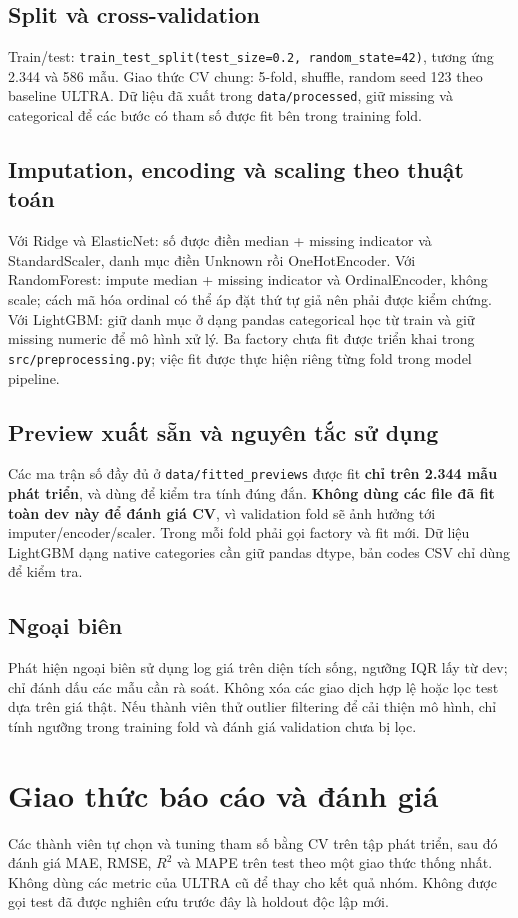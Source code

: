 \documentclass[12pt,a4paper]{article}
\begin{document}
\subsection{Split và cross-validation}
Train/test: \texttt{train\_test\_split(test\_size=0.2, random\_state=42)}, tương ứng 2.344 và 586 mẫu. Giao thức CV chung: 5-fold, shuffle, random seed 123 theo baseline ULTRA. Dữ liệu đã xuất trong \texttt{data/processed}, giữ missing và categorical để các bước có tham số được fit bên trong training fold.
\subsection{Imputation, encoding và scaling theo thuật toán}
Với Ridge và ElasticNet: số được điền median + missing indicator và StandardScaler, danh mục điền Unknown rồi OneHotEncoder. Với RandomForest: impute median + missing indicator và OrdinalEncoder, không scale; cách mã hóa ordinal có thể áp đặt thứ tự giả nên phải được kiểm chứng. Với LightGBM: giữ danh mục ở dạng pandas categorical học từ train và giữ missing numeric để mô hình xử lý. Ba factory chưa fit được triển khai trong \texttt{src/preprocessing.py}; việc fit được thực hiện riêng từng fold trong model pipeline.
\subsection{Preview xuất sẵn và nguyên tắc sử dụng}
Các ma trận số đầy đủ ở \texttt{data/fitted\_previews} được fit \textbf{chỉ trên 2.344 mẫu phát triển}, và dùng để kiểm tra tính đúng đắn. \textbf{Không dùng các file đã fit toàn dev này để đánh giá CV}, vì validation fold sẽ ảnh hưởng tới imputer/encoder/scaler. Trong mỗi fold phải gọi factory và fit mới. Dữ liệu LightGBM dạng native categories cần giữ pandas dtype, bản codes CSV chỉ dùng để kiểm tra.
\subsection{Ngoại biên}
Phát hiện ngoại biên sử dụng log giá trên diện tích sống, ngưỡng IQR lấy từ dev; chỉ đánh dấu các mẫu cần rà soát. Không xóa các giao dịch hợp lệ hoặc lọc test dựa trên giá thật. Nếu thành viên thử outlier filtering để cải thiện mô hình, chỉ tính ngưỡng trong training fold và đánh giá validation chưa bị lọc.
\section{Giao thức báo cáo và đánh giá}
Các thành viên tự chọn và tuning tham số bằng CV trên tập phát triển, sau đó đánh giá MAE, RMSE, $R^2$ và MAPE trên test theo một giao thức thống nhất. Không dùng các metric của ULTRA cũ để thay cho kết quả nhóm. Không được gọi test đã được nghiên cứu trước đây là holdout độc lập mới.


\end{document}
